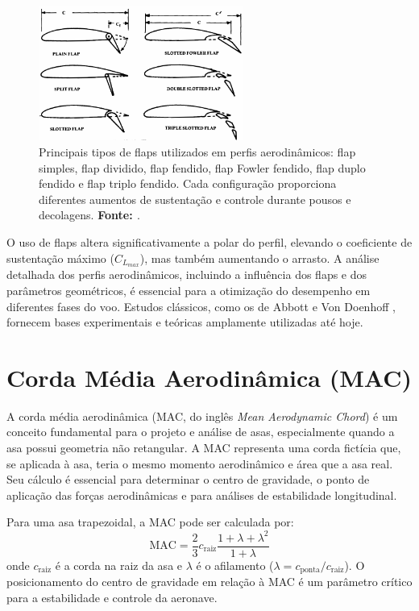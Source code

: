 \begin{figure}[H]
    \centering
    \includegraphics[width=0.6\textwidth]{figures/perfil_flap.png}
    \caption{Principais tipos de flaps utilizados em perfis aerodinâmicos: flap simples, flap dividido, flap fendido, flap Fowler fendido, flap duplo fendido e flap triplo fendido. Cada configuração proporciona diferentes aumentos de sustentação e controle durante pousos e decolagens. \textbf{Fonte: \cite{raymer2018aircraft}}.}
    \label{fig:perfil_flap}
\end{figure}

O uso de flaps altera significativamente a polar do perfil, elevando o coeficiente de sustentação máximo (\(C_{L_{max}}\)), mas também aumentando o arrasto. A análise detalhada dos perfis aerodinâmicos, incluindo a influência dos flaps e dos parâmetros geométricos, é essencial para a otimização do desempenho em diferentes fases do voo. Estudos clássicos, como os de Abbott e Von Doenhoff \cite{abbott1959theory}, fornecem bases experimentais e teóricas amplamente utilizadas até hoje.

\section{Corda Média Aerodinâmica (MAC)}
A corda média aerodinâmica (MAC, do inglês \textit{Mean Aerodynamic Chord}) é um conceito fundamental para o projeto e análise de asas, especialmente quando a asa possui geometria não retangular. A MAC representa uma corda fictícia que, se aplicada à asa, teria o mesmo momento aerodinâmico e área que a asa real. Seu cálculo é essencial para determinar o centro de gravidade, o ponto de aplicação das forças aerodinâmicas e para análises de estabilidade longitudinal.

Para uma asa trapezoidal, a MAC pode ser calculada por:
\[
\text{MAC} = \frac{2}{3} c_\text{raiz} \frac{1 + \lambda + \lambda^2}{1 + \lambda}
\]
onde \(c_\text{raiz}\) é a corda na raiz da asa e \(\lambda\) é o afilamento (\(\lambda = c_\text{ponta}/c_\text{raiz}\)). O posicionamento do centro de gravidade em relação à MAC é um parâmetro crítico para a estabilidade e controle da aeronave.

